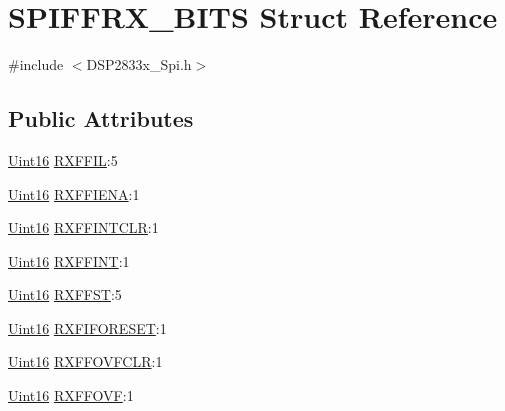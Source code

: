 \hypertarget{struct_s_p_i_f_f_r_x___b_i_t_s}{}\section{S\+P\+I\+F\+F\+R\+X\+\_\+\+B\+I\+T\+S Struct Reference}
\label{struct_s_p_i_f_f_r_x___b_i_t_s}


{\ttfamily \#include $<$D\+S\+P2833x\+\_\+\+Spi.\+h$>$}

\subsection*{Public Attributes}
\begin{DoxyCompactItemize}
\item 
\hyperlink{_d_s_p2833x___device_8h_a59a9f6be4562c327cbfb4f7e8e18f08b}{Uint16} \hyperlink{struct_s_p_i_f_f_r_x___b_i_t_s_a44fcc04e1f6cfa26beb3b33981f96f59}{R\+X\+F\+F\+I\+L}\+:5
\item 
\hyperlink{_d_s_p2833x___device_8h_a59a9f6be4562c327cbfb4f7e8e18f08b}{Uint16} \hyperlink{struct_s_p_i_f_f_r_x___b_i_t_s_abf842692b7c98a591a7171ef9419288c}{R\+X\+F\+F\+I\+E\+N\+A}\+:1
\item 
\hyperlink{_d_s_p2833x___device_8h_a59a9f6be4562c327cbfb4f7e8e18f08b}{Uint16} \hyperlink{struct_s_p_i_f_f_r_x___b_i_t_s_ad0c6f8c6a0db1cfb6a70cb244faf5d9a}{R\+X\+F\+F\+I\+N\+T\+C\+L\+R}\+:1
\item 
\hyperlink{_d_s_p2833x___device_8h_a59a9f6be4562c327cbfb4f7e8e18f08b}{Uint16} \hyperlink{struct_s_p_i_f_f_r_x___b_i_t_s_a4a60c3aab51531e2ba9f1691d94f9be0}{R\+X\+F\+F\+I\+N\+T}\+:1
\item 
\hyperlink{_d_s_p2833x___device_8h_a59a9f6be4562c327cbfb4f7e8e18f08b}{Uint16} \hyperlink{struct_s_p_i_f_f_r_x___b_i_t_s_aa533f3688ad1f4cec4892f5fc2de4d60}{R\+X\+F\+F\+S\+T}\+:5
\item 
\hyperlink{_d_s_p2833x___device_8h_a59a9f6be4562c327cbfb4f7e8e18f08b}{Uint16} \hyperlink{struct_s_p_i_f_f_r_x___b_i_t_s_a5116388be4972695413bb7c247baca0c}{R\+X\+F\+I\+F\+O\+R\+E\+S\+E\+T}\+:1
\item 
\hyperlink{_d_s_p2833x___device_8h_a59a9f6be4562c327cbfb4f7e8e18f08b}{Uint16} \hyperlink{struct_s_p_i_f_f_r_x___b_i_t_s_abe94630a6c302322b5795f60134b0d93}{R\+X\+F\+F\+O\+V\+F\+C\+L\+R}\+:1
\item 
\hyperlink{_d_s_p2833x___device_8h_a59a9f6be4562c327cbfb4f7e8e18f08b}{Uint16} \hyperlink{struct_s_p_i_f_f_r_x___b_i_t_s_a87855fbacb428bd93cd0970a41fc3048}{R\+X\+F\+F\+O\+V\+F}\+:1
\end{DoxyCompactItemize}


